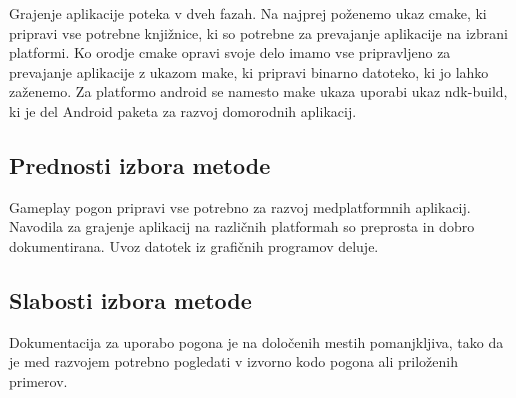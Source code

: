 Grajenje aplikacije poteka v dveh fazah. Na najprej poženemo ukaz cmake, ki pripravi vse potrebne knjižnice, ki so potrebne za prevajanje aplikacije na izbrani platformi. Ko orodje cmake opravi svoje delo imamo vse pripravljeno za prevajanje aplikacije z ukazom make, ki pripravi binarno datoteko, ki jo lahko zaženemo. Za platformo android se namesto make ukaza uporabi ukaz ndk-build, ki je del Android paketa za razvoj domorodnih aplikacij.  

\subsection{Prednosti izbora metode}

Gameplay pogon pripravi vse potrebno za razvoj medplatformnih aplikacij. Navodila za grajenje aplikacij na različnih platformah so preprosta in dobro dokumentirana. Uvoz datotek iz grafičnih programov deluje.

\subsection{Slabosti izbora metode}

Dokumentacija za uporabo pogona je na določenih mestih pomanjkljiva, tako da je med razvojem potrebno pogledati v izvorno kodo pogona ali priloženih primerov. 




